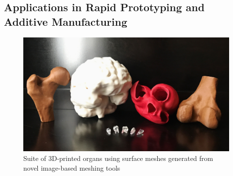 \subsection[Applications in Rapid Prototyping and Additive Manufacturing]{\texorpdfstring{Applications in Rapid Prototyping and Additive \newline Manufacturing}{Applications in Rapid Prototyping and Additive \newline Manufacturing}}
\label{Applications in Rapid Prototyping and Additive Manufacturing}

\cite{fda3_2016}

\begin{figure}
\centering
		\includegraphics[width=1.0\textwidth]{media/6-3dprint/3dprint.jpg}
%
\caption{Suite of 3D-printed organs using surface meshes generated from novel image-based meshing tools}
\label{fig:3dprint}
\end{figure}

